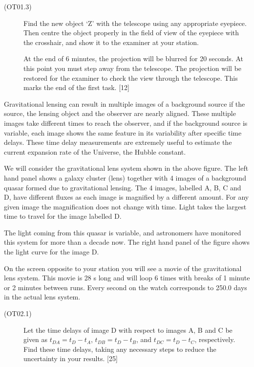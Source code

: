 \begin{description}
\item[(OT01.3)] Find the new object `Z' with the telescope using any
  appropriate eyepiece. Then centre the object properly in the field of view
  of the eyepiece with the crosshair, and show it to the examiner at your
  station.

  At the end of 6 minutes, the projection will be blurred for 20 seconds. At
  this point you must step away from the telescope. The projection will be
  restored for the examiner to check the view through the telescope. This
  marks the end of the first task. \hfill[12]
\end{description}

Gravitational lensing can result in multiple images of a background source
if the source, the lensing object and the observer are nearly aligned. These
multiple images take different times to reach the observer, and if the
background source is variable, each image shows the same feature in its
variability after specific time delays. These time delay measurements are
extremely useful to estimate the current expansion rate of the Universe, the
Hubble constant.

We will consider the gravitational lens system shown in the above figure.
The left hand panel shows a galaxy cluster (lens) together with 4 images of
a background quasar formed due to gravitational lensing. The 4 images,
labelled A, B, C and D, have different fluxes as each image is magnified by
a different amount. For any given image the magnification does not change
with time. Light takes the largest time to travel for the image labelled D.


The light coming from this quasar is variable, and astronomers have
monitored this system for more than a decade now. The right hand panel of
the figure shows the light curve for the image D.

On the screen opposite to your station you will see a movie of the
gravitational lens system. This movie is 28 s long and will loop 6 times
with breaks of 1 minute or 2 minutes between runs. Every second on the watch
corresponds to 250.0 days in the actual lens system.

\begin{description}
\item[(OT02.1)] Let the time delays of image D with respect to images A, B
  and C be given as $t_{DA} = t_D - t_A$, $t_{DB} = t_D - t_B$, and
  $t_{DC} = t_D - t_C$, respectively. Find these time delays, taking any
  necessary steps to reduce the uncertainty in your results. \hfill[25]
\end{description}

